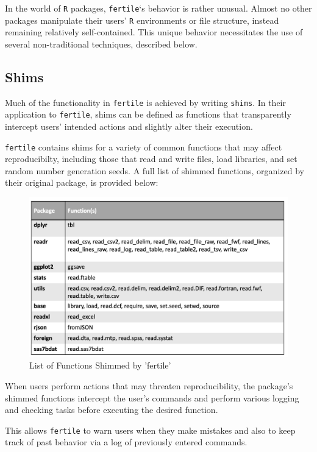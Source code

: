 \documentclass[12pt,twoside]{reedthesis}
\begin{document}
In the world of \texttt{R} packages, \texttt{fertile}`s behavior is
rather unusual. Almost no other packages manipulate their users'
\texttt{R} environments or file structure, instead remaining relatively
self-contained. This unique behavior necessitates the use of several
non-traditional techniques, described below.

\subsection{Shims}\label{shims}

Much of the functionality in \texttt{fertile} is achieved by writing
\texttt{shims}. In their application to \texttt{fertile}, shims can be
defined as functions that transparently intercept users' intended
actions and slightly alter their execution.

\texttt{fertile} contains shims for a variety of common functions that
may affect reproducibilty, including those that read and write files,
load libraries, and set random number generation seeds. A full list of
shimmed functions, organized by their original package, is provided
below:
\begin{figure}
\includegraphics[width=1\linewidth]{figure/shims-list} \caption{List of Functions Shimmed by 'fertile'}\label{fig:unnamed-chunk-35}
\end{figure}
When users perform actions that may threaten reproducibility, the
package's shimmed functions intercept the user's commands and perform
various logging and checking tasks before executing the desired
function.

This allows \texttt{fertile} to warn users when they make mistakes and
also to keep track of past behavior via a log of previously entered
commands.
\end{document}
